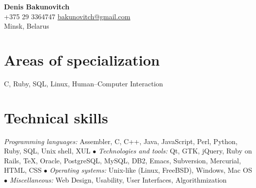 \documentclass[12pt, a4paper]{article}
\begin{document}
\newlength{\rcollength}\setlength{\rcollength}{1.85in}%

\textbf{\Huge Denis Bakunovitch}\\
+375 29 3364747 \hfill \href{mailto:bakunovitch@gmail.com}{bakunovitch@gmail.com}\\
Minsk, Belarus\\
\quad\pagebreak[2]
\hrulefill

\section*{Areas of specialization}
C, Ruby, SQL, Linux, Human--Computer Interaction

\section*{Technical skills}
\textit{Programming languages:} Assembler, C, C++, Java, JavaScript, Perl, Python, Ruby, SQL, Unix
shell, XUL $\bullet$
\textit{Technologies and tools:} Qt, GTK, jQuery, Ruby on Rails, \TeX, Oracle, PostgreSQL,
MySQL, DB2, Emacs, Subversion, Mercurial, HTML, CSS $\bullet$
\textit{Operating systems:} Unix-like (Linux, FreeBSD), Windows, Mac
OS $\bullet$
\textit{Miscellaneous:} Web Design, Usability, User Interfaces,
Algorithmization
\end{document}
